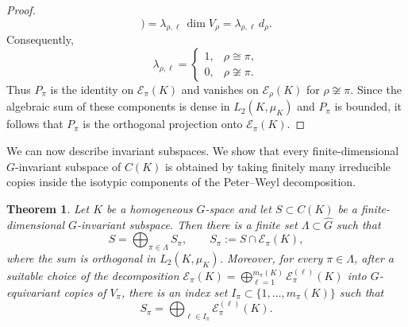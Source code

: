 \documentclass[11pt,showkeys]{amsart}
\newtheorem{theorem}{Theorem}[section]
\begin{document}
\begin{proof}
\[        \bigr)
        =
        \lambda_{\rho,\ell}\,\dim V_\rho
        =
        \lambda_{\rho,\ell}\,d_\rho .
\]
Consequently,
\[
        \lambda_{\rho,\ell}
        =
        \begin{cases}
        1, & \rho\cong\pi,\\
        0, & \rho\not\cong\pi.
        \end{cases}
\]
Thus \(P_\pi\) is the identity on \(\mathcal E_\pi(K)\) and vanishes on
\(\mathcal E_\rho(K)\) for \(\rho\not\cong\pi\).  Since the algebraic sum of these components is dense in \(L_2(K,\mu_K)\) and \(P_\pi\) is bounded, it follows that
\(P_\pi\) is the orthogonal projection onto \(\mathcal E_\pi(K)\).
\end{proof}

We can now describe invariant subspaces. We show that  every finite-dimensional \(G\)-invariant subspace of
\(C(K)\) is obtained by taking finitely many irreducible copies inside
the isotypic components of the Peter--Weyl decomposition.

\begin{theorem}
\label{thm:invariant-subspaces}
Let \(K\) be a homogeneous \(G\)-space and let
\(S\subset C(K)\) be a finite-dimensional \(G\)-invariant subspace. Then
there is a finite set \(\Lambda\subset\widehat G\) such that
\[
        S
        =
        \bigoplus_{\pi\in\Lambda}
        S_\pi,
        \qquad
        S_\pi:=S\cap\mathcal E_\pi(K),
\]
where the sum is orthogonal in \(L_2(K,\mu_K)\).
Moreover, for every \(\pi\in\Lambda\), after a suitable choice of the
decomposition
\(
        \mathcal E_\pi(K)
        =
        \bigoplus_{\ell=1}^{m_\pi(K)}
        \mathcal E_\pi^{(\ell)}(K)
\)
into \(G\)-equivariant copies of \(V_\pi\), there is an index set
\(
        I_\pi\subset\{1,\ldots,m_\pi(K)\}
\)
such that
\[
        S_\pi
        =
        \bigoplus_{\ell\in I_\pi}
        \mathcal E_\pi^{(\ell)}(K).
\]
\end{theorem}
\end{document}
